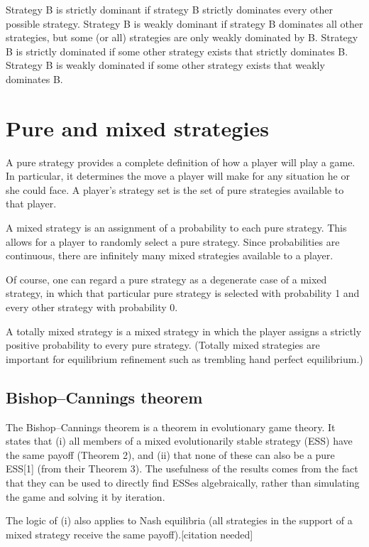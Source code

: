 \documentclass[]{report}
\begin{document}
Strategy B is strictly dominant if strategy B strictly dominates every other possible strategy.
Strategy B is weakly dominant if strategy B dominates all other strategies, but some (or all) strategies are only weakly dominated by B.
Strategy B is strictly dominated if some other strategy exists that strictly dominates B.
Strategy B is weakly dominated if some other strategy exists that weakly dominates B.


\section{Pure and mixed strategies}
A pure strategy provides a complete definition of how a player will play a game. In particular, it determines the move a player will make for any situation he or she could face. A player's strategy set is the set of pure strategies available to that player.

A mixed strategy is an assignment of a probability to each pure strategy. This allows for a player to randomly select a pure strategy. Since probabilities are continuous, there are infinitely many mixed strategies available to a player.

Of course, one can regard a pure strategy as a degenerate case of a mixed strategy, in which that particular pure strategy is selected with probability 1 and every other strategy with probability 0.

A totally mixed strategy is a mixed strategy in which the player assigns a strictly positive probability to every pure strategy. (Totally mixed strategies are important for equilibrium refinement such as trembling hand perfect equilibrium.)



\subsection{Bishop–Cannings theorem}
The Bishop–Cannings theorem is a theorem in evolutionary game theory. It states that (i) all members of a mixed evolutionarily stable strategy (ESS) have the same payoff (Theorem 2), and (ii) that none of these can also be a pure ESS[1] (from their Theorem 3). The usefulness of the results comes from the fact that they can be used to directly find ESSes algebraically, rather than simulating the game and solving it by iteration.

The logic of (i) also applies to Nash equilibria (all strategies in the support of a mixed strategy receive the same payoff).[citation needed]
\end{document}

